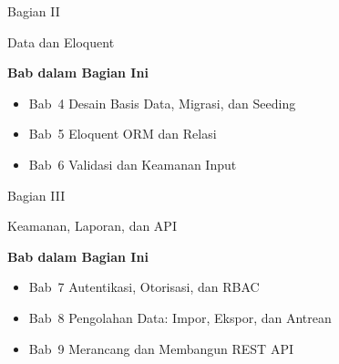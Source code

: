 \documentclass[
    paper=23cm:15.5cm,   %
    11pt,               %
    twoside,            %
    openany,            %
    bibliography=totoc, %
]{scrbook}            %
\begin{document}
\newpage
{}
\vspace*{4cm}
{\fontsize{28}{34}\sffamily\bfseries\raggedright Bagian II\par}
\vspace{6pt}
{\fontsize{22}{28}\sffamily\bfseries\raggedright Data dan Eloquent\par}
\vspace{16pt}
{\large\sffamily\bfseries Bab dalam Bagian Ini}\par
\vspace{6pt}
\begin{itemize}[topsep=0pt, itemsep=2pt]
  \item Bab~4 \textbullet{} Desain Basis Data, Migrasi, dan Seeding
  \item Bab~5 \textbullet{} Eloquent ORM dan Relasi
  \item Bab~6 \textbullet{} Validasi dan Keamanan Input
\end{itemize}
\newpage







\newpage
{}
\vspace*{4cm}
{\fontsize{28}{34}\sffamily\bfseries\raggedright Bagian III\par}
\vspace{6pt}
{\fontsize{22}{28}\sffamily\bfseries\raggedright Keamanan, Laporan, dan API\par}
\vspace{16pt}
{\large\sffamily\bfseries Bab dalam Bagian Ini}\par
\vspace{6pt}
\begin{itemize}[topsep=0pt, itemsep=2pt]
  \item Bab~7 \textbullet{} Autentikasi, Otorisasi, dan RBAC
  \item Bab~8 \textbullet{} Pengolahan Data: Impor, Ekspor, dan Antrean
  \item Bab~9 \textbullet{} Merancang dan Membangun REST API
\end{itemize}
\newpage
\end{document}
